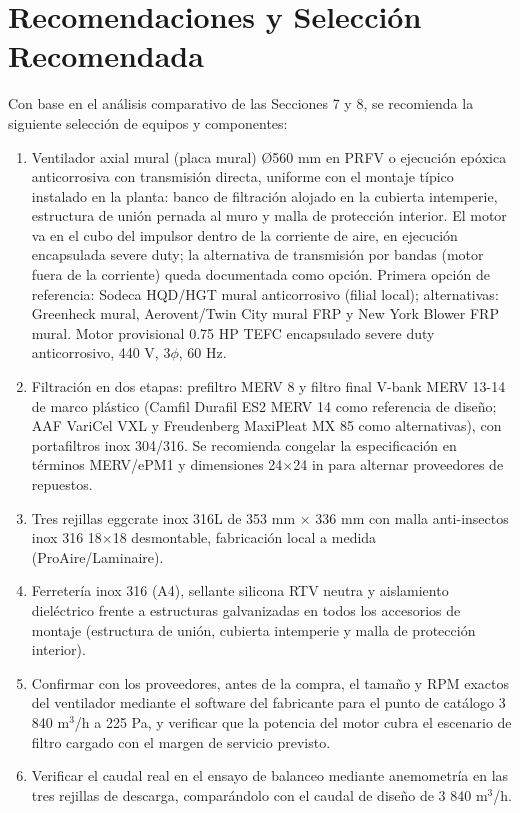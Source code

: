 \section{Recomendaciones y Selección Recomendada}

Con base en el análisis comparativo de las Secciones 7 y 8, se recomienda la siguiente selección de equipos y componentes:

\begin{enumerate}
\item Ventilador axial mural (placa mural) Ø560 mm en PRFV o ejecución epóxica anticorrosiva con transmisión directa, uniforme con el montaje típico instalado en la planta: banco de filtración alojado en la cubierta intemperie, estructura de unión pernada al muro y malla de protección interior. El motor va en el cubo del impulsor dentro de la corriente de aire, en ejecución encapsulada severe duty; la alternativa de transmisión por bandas (motor fuera de la corriente) queda documentada como opción. Primera opción de referencia: Sodeca HQD/HGT mural anticorrosivo (filial local); alternativas: Greenheck mural, Aerovent/Twin City mural FRP y New York Blower FRP mural. Motor provisional 0.75 HP TEFC encapsulado severe duty anticorrosivo, 440 V, 3$\phi$, 60 Hz.
\item Filtración en dos etapas: prefiltro MERV 8 y filtro final V-bank MERV 13-14 de marco plástico (Camfil Durafil ES2 MERV 14 como referencia de diseño; AAF VariCel VXL y Freudenberg MaxiPleat MX 85 como alternativas), con portafiltros inox 304/316. Se recomienda congelar la especificación en términos MERV/ePM1 y dimensiones 24$\times$24 in para alternar proveedores de repuestos.
\item Tres rejillas eggcrate inox 316L de 353 mm $\times$ 336 mm con malla anti-insectos inox 316 18$\times$18 desmontable, fabricación local a medida (ProAire/Laminaire).
\item Ferretería inox 316 (A4), sellante silicona RTV neutra y aislamiento dieléctrico frente a estructuras galvanizadas en todos los accesorios de montaje (estructura de unión, cubierta intemperie y malla de protección interior).
\item Confirmar con los proveedores, antes de la compra, el tamaño y RPM exactos del ventilador mediante el software del fabricante para el punto de catálogo 3 840 m$^3$/h a 225 Pa, y verificar que la potencia del motor cubra el escenario de filtro cargado con el margen de servicio previsto.
\item Verificar el caudal real en el ensayo de balanceo mediante anemometría en las tres rejillas de descarga, comparándolo con el caudal de diseño de 3 840 m$^3$/h.
\end{enumerate}
